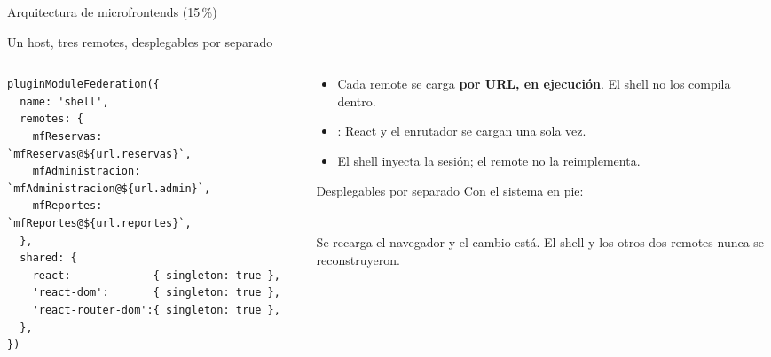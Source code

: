 %
%

%
       {Arquitectura de microfrontends (15\,\%)}

\begin{frame}[fragile]{Un host, tres remotes, desplegables por separado}

  \begin{columns}[T]
    \begin{column}{0.53\textwidth}
      \begin{lstlisting}[language=jsts,basicstyle=\ttfamily\tiny]
pluginModuleFederation({
  name: 'shell',
  remotes: {
    mfReservas:       `mfReservas@${url.reservas}`,
    mfAdministracion: `mfAdministracion@${url.admin}`,
    mfReportes:       `mfReportes@${url.reportes}`,
  },
  shared: {
    react:             { singleton: true },
    'react-dom':       { singleton: true },
    'react-router-dom':{ singleton: true },
  },
})
      \end{lstlisting}
      {\scriptsize\color{textoSuave} }
    \end{column}
    \begin{column}{0.44\textwidth}
      \begin{itemize}\scriptsize
        \item Cada remote se carga \textbf{por URL, en ejecución}. El shell no
              los compila dentro.
        \item {}: React y el enrutador se cargan una sola vez.
        \item El shell inyecta la sesión; el remote no la reimplementa.
      \end{itemize}
      \begin{block}{Desplegables por separado}
        \scriptsize
        Con el sistema en pie:\\
        \\
        \\[3pt]
        Se recarga el navegador y el cambio está. \alert{El shell y los otros
        dos remotes nunca se reconstruyeron.}
      \end{block}
    \end{column}
  \end{columns}
\end{frame}
